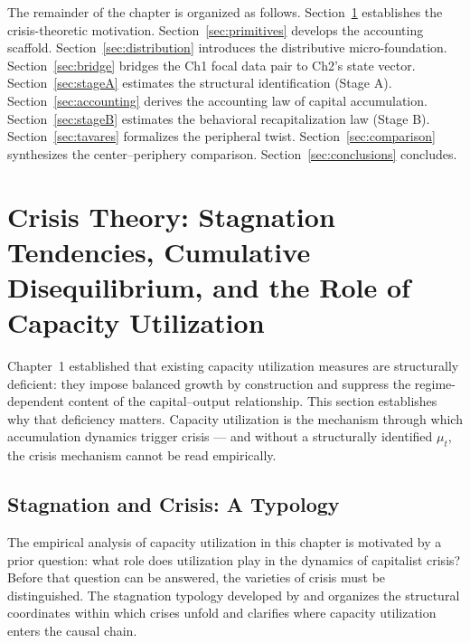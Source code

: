 \documentclass[12pt,letterpaper]{article}
\newcommand{\mut}{\mu_t}           %
\begin{document}
The remainder of the chapter is organized as follows.
Section~\ref{sec:crisis} establishes the crisis-theoretic motivation.
Section~\ref{sec:primitives} develops the accounting scaffold.
Section~\ref{sec:distribution} introduces the distributive micro-foundation.
Section~\ref{sec:bridge} bridges the Ch1 focal data pair to Ch2's state vector.
Section~\ref{sec:stageA} estimates the structural identification (Stage A).
Section~\ref{sec:accounting} derives the accounting law of capital accumulation.
Section~\ref{sec:stageB} estimates the behavioral recapitalization law (Stage B).
Section~\ref{sec:tavares} formalizes the peripheral twist.
Section~\ref{sec:comparison} synthesizes the center--periphery comparison.
Section~\ref{sec:conclusions} concludes.


\section{Crisis Theory: Stagnation Tendencies, Cumulative Disequilibrium,
  and the Role of Capacity Utilization}
\label{sec:crisis}

Chapter~1 established that existing capacity utilization measures are
structurally deficient: they impose balanced growth by construction and
suppress the regime-dependent content of the capital--output relationship.
This section establishes why that deficiency matters. Capacity utilization is
the mechanism through which accumulation dynamics trigger crisis --- and
without a structurally identified $\mut$, the crisis mechanism cannot be read
empirically.


\subsection{Stagnation and Crisis: A Typology}
\label{sec:crisis_typology}

The empirical analysis of capacity utilization in this chapter is motivated by
a prior question: what role does utilization play in the dynamics of capitalist
crisis? Before that question can be answered, the varieties of crisis must be
distinguished. The stagnation typology developed by
\citet{vidal2014,vidal2019} and \citet{basu2019} organizes the structural
coordinates within which crises unfold and clarifies where capacity utilization
enters the causal chain.
\end{document}
